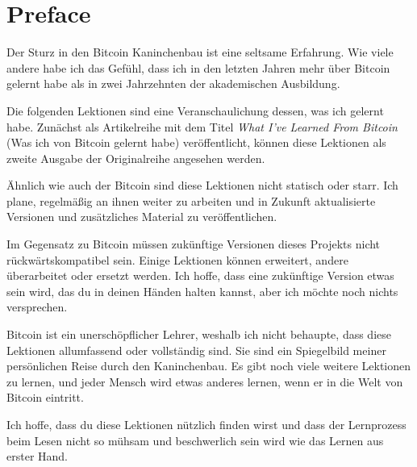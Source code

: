 \chapter*{Preface}
Der Sturz in den Bitcoin Kaninchenbau ist eine seltsame Erfahrung. Wie viele
andere habe ich das Gefühl, dass ich in den letzten Jahren mehr über Bitcoin
gelernt habe als in zwei Jahrzehnten der akademischen Ausbildung.

Die folgenden Lektionen sind eine Veranschaulichung dessen, was ich gelernt
habe. Zunächst als Artikelreihe mit dem Titel \textit{What I’ve Learned From
Bitcoin} (Was ich von Bitcoin gelernt habe) veröffentlicht, können diese
Lektionen als zweite Ausgabe der Originalreihe angesehen werden.

Ähnlich wie auch der Bitcoin sind diese Lektionen nicht statisch oder starr. Ich
plane, regelmäßig an ihnen weiter zu arbeiten und in Zukunft aktualisierte
Versionen und zusätzliches Material zu veröffentlichen.

Im Gegensatz zu Bitcoin müssen zukünftige Versionen dieses Projekts nicht
rückwärtskompatibel sein. Einige Lektionen können erweitert, andere überarbeitet
oder ersetzt werden. Ich hoffe, dass eine zukünftige Version etwas sein wird,
das du in deinen Händen halten kannst, aber ich möchte noch nichts versprechen.

Bitcoin ist ein unerschöpflicher Lehrer, weshalb ich nicht behaupte, dass diese
Lektionen allumfassend oder vollständig sind. Sie sind ein Spiegelbild meiner
persönlichen Reise durch den Kaninchenbau. Es gibt noch viele weitere Lektionen
zu lernen, und jeder Mensch wird etwas anderes lernen, wenn er in die Welt von
Bitcoin eintritt.

Ich hoffe, dass du diese Lektionen nützlich finden wirst und dass der
Lernprozess beim Lesen nicht so mühsam und beschwerlich sein wird wie das Lernen
aus erster Hand.

%
%
